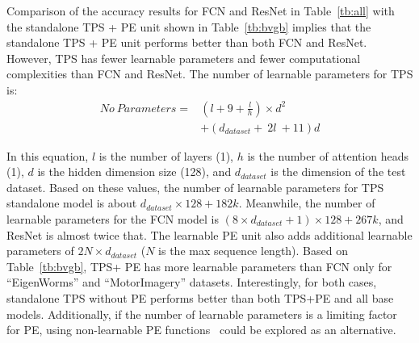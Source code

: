 \documentclass[journal]{IEEEtran}
\begin{document}
Comparison of the accuracy results for FCN and ResNet in Table~\ref{tb:all} with the standalone TPS + PE unit shown in Table~\ref{tb:bvgb} implies that the standalone TPS + PE unit performs better than both FCN and ResNet. However, TPS has fewer learnable parameters and fewer computational complexities than FCN and ResNet. The number of learnable parameters for TPS is:
\begin{equation} \label{eq:noptp}
\begin{split}
No\ Parameters=&\left(l+9+\frac{l}{h}\right)\times d^2\\
& +\left(d_{dataset}+\ 2l\ +11\right)d
\end{split}
\end{equation}

In this equation, $l$ is the number of layers (1), $h$ is the number of attention heads (1), $d$ is the hidden dimension size (128), and $d_{dataset}$ is the dimension of the test dataset. Based on these values, the number of learnable parameters for TPS standalone model is about $d_{dataset} \times 128 + 182k$. Meanwhile, the number of learnable parameters for the FCN model is $(8\times d_{dataset}+1)\times 128 + 267k$, and ResNet is almost twice that. The learnable PE unit also adds additional learnable parameters of $ 2N \times d_{dataset}$ ($N$ is the max sequence length). Based on Table~\ref{tb:bvgb}, TPS+ PE has more learnable parameters than FCN only for ``EigenWorms” and ``MotorImagery” datasets. Interestingly, for both cases, standalone TPS without PE performs better than both TPS+PE and all base models. Additionally, if the number of learnable parameters is a limiting factor for PE, using non-learnable PE functions~\cite{ vaswani2017attention} could be explored as an alternative.
\end{document}
